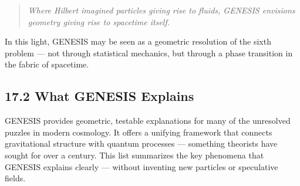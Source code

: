 \documentclass{article}
\begin{document}
\begin{quote}
\emph{Where Hilbert imagined particles giving rise to fluids, GENESIS envisions geometry giving rise to spacetime itself.}
\end{quote}

\noindent In this light, GENESIS may be seen as a geometric resolution of the sixth problem — not through statistical mechanics, but through a phase transition in the fabric of spacetime.





\subsection*{17.2 What GENESIS Explains}
\label{sec:genesis-explains}

\begin{tcolorbox}[colback=white, colframe=green!50!black, title=Why GENESIS really matters]
GENESIS provides geometric, testable explanations for many of the unresolved puzzles in modern cosmology.  
It offers a unifying framework that connects gravitational structure with quantum processes — something theorists have sought for over a century.  
This list summarizes the key phenomena that GENESIS explains clearly — without inventing new particles or speculative fields.
\end{tcolorbox}

\vspace{1em}
\end{document}
